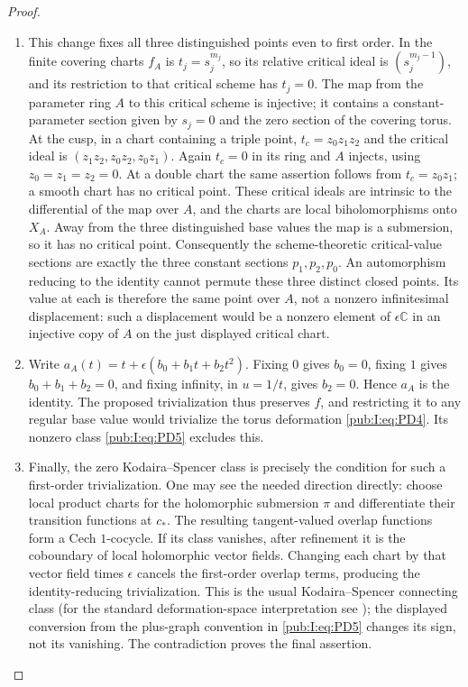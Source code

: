\begin{proof}
\begin{enumerate}[label=\arabic*.,leftmargin=*]
\item This change fixes all three distinguished points even to first order.
In the finite covering charts
$f_A$ is $t_j=s_j^{m_j}$, so its relative critical ideal is
$(s_j^{m_j-1})$, and its restriction to that critical scheme has
$t_j=0$. The map from the parameter ring $A$ to this critical
scheme is injective; it contains a constant-parameter section given
by $s_j=0$ and the zero section of the covering torus.
At the cusp, in a chart containing a triple point,
$t_c=z_0z_1z_2$ and the critical ideal is
$(z_1z_2,z_0z_2,z_0z_1)$. Again $t_c=0$ in its ring and $A$ injects,
using $z_0=z_1=z_2=0$. At a double chart the same assertion follows
from $t_c=z_0z_1$; a smooth chart has no critical point.
These critical ideals are intrinsic to the differential of the map
over $A$, and the charts are local biholomorphisms onto $X_A$.
Away from the three distinguished base values the map is a
submersion, so it has no critical point.
Consequently the scheme-theoretic critical-value sections are exactly
the three constant sections $p_1,p_2,p_0$. An automorphism reducing
to the identity cannot permute these three distinct closed points.
Its value at each is therefore the same point over $A$, not a
nonzero infinitesimal displacement: such a displacement would be a
nonzero element of $\epsilon\mathbb C$ in an injective copy of $A$
on the just displayed critical chart.

\item Write $a_A(t)=t+\epsilon(b_0+b_1t+b_2t^2)$.
Fixing $0$ gives $b_0=0$, fixing $1$ gives $b_0+b_1+b_2=0$,
and fixing infinity, in $u=1/t$, gives $b_2=0$.
Hence $a_A$ is the identity. The proposed trivialization thus
preserves $f$, and restricting it to any regular base value would
trivialize the torus deformation \eqref{pub:I:eq:PD4}. Its nonzero class \eqref{pub:I:eq:PD5}
excludes this.

\item Finally, the zero Kodaira--Spencer class is precisely the condition for
such a first-order trivialization. One may see the needed direction
directly: choose local product charts for the holomorphic submersion
$\pi$ and differentiate their transition functions at $c_*$. The
resulting tangent-valued overlap functions form a Cech $1$-cocycle.
If its class vanishes, after refinement it is the coboundary of local
holomorphic vector fields. Changing each chart by that vector field
times $\epsilon$ cancels the first-order overlap terms, producing
the identity-reducing trivialization. This is the usual
Kodaira--Spencer connecting class (for the standard deformation-space
interpretation see \cite[Section~67, p.~15]{McMullen1996Complex});
the displayed conversion
from the plus-graph convention in \eqref{pub:I:eq:PD5} changes its sign, not its
vanishing. The contradiction proves the final assertion.
\end{enumerate}
\end{proof}

